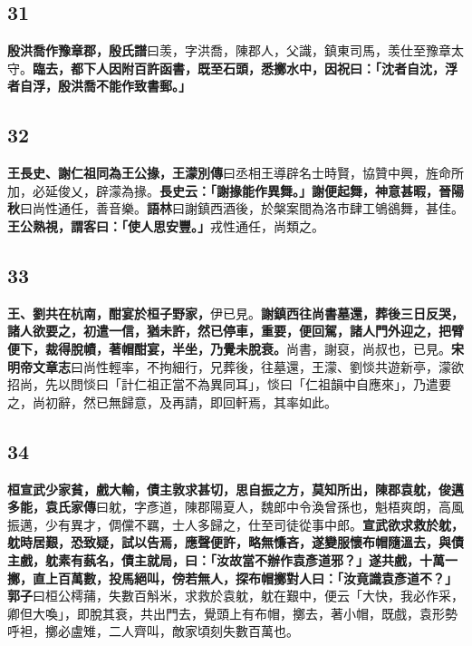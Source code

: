 \subsection*{31}

\textbf{殷洪喬作豫章郡，}{\footnotesize \textbf{殷氏譜}曰羡，字洪喬，陳郡人，父識，鎮東司馬，羡仕至豫章太守。}\textbf{臨去，都下人因附百許函書，既至石頭，悉擲水中，因祝曰：「沈者自沈，浮者自浮，殷洪喬不能作致書郵。」}

\subsection*{32}

\textbf{王長史、謝仁祖同為王公掾，}{\footnotesize \textbf{王濛別傳}曰丞相王導辟名士時賢，協贊中興，旌命所加，必延俊乂，辟濛為掾。}\textbf{長史云：「謝掾能作異舞。」謝便起舞，神意甚暇，}{\footnotesize \textbf{晉陽秋}曰尚性通任，善音樂。\textbf{語林}曰謝鎮西酒後，於槃案間為洛市肆工鴝鵒舞，甚佳。}\textbf{王公熟視，謂客曰：「使人思安豐。」}{\footnotesize 戎性通任，尚類之。}

\subsection*{33}

\textbf{王、劉共在杭南，酣宴於桓子野家，}{\footnotesize 伊已見。}\textbf{謝鎮西往尚書墓還，葬後三日反哭，諸人欲要之，初遣一信，猶未許，然已停車，重要，便回駕，諸人門外迎之，把臂便下，裁得脫幘，著帽酣宴，半坐，乃覺未脫衰。}{\footnotesize 尚書，謝裒，尚叔也，已見。\textbf{宋明帝文章志}曰尚性輕率，不拘細行，兄葬後，往墓還，王濛、劉惔共遊新亭，濛欲招尚，先以問惔曰「計仁祖正當不為異同耳」，惔曰「仁祖韻中自應來」，乃遣要之，尚初辭，然已無歸意，及再請，即回軒焉，其率如此。}

\subsection*{34}

\textbf{桓宣武少家貧，戲大輸，債主敦求甚切，思自振之方，莫知所出，陳郡袁躭，俊邁多能，}{\footnotesize \textbf{袁氏家傳}曰躭，字彥道，陳郡陽夏人，魏郎中令渙曾孫也，魁梧爽朗，高風振邁，少有異才，倜儻不羈，士人多歸之，仕至司徒從事中郎。}\textbf{宣武欲求救於躭，躭時居艱，恐致疑，試以告焉，應聲便許，略無慊吝，遂變服懷布帽隨溫去，與債主戲，躭素有蓺名，債主就局，曰：「汝故當不辦作袁彥道邪？」遂共戲，十萬一擲，直上百萬數，投馬絕叫，傍若無人，探布帽擲對人曰：「汝竟識袁彥道不？」}{\footnotesize \textbf{郭子}曰桓公樗蒱，失數百斛米，求救於袁躭，躭在艱中，便云「大快，我必作采，卿但大喚」，即脫其衰，共出門去，覺頭上有布帽，擲去，著小帽，既戲，袁形勢呼袒，擲必盧雉，二人齊叫，敵家頃刻失數百萬也。}

